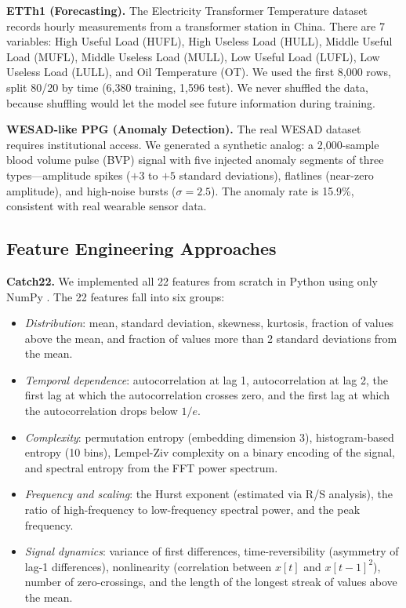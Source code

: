 \documentclass[10pt,conference]{IEEEtran}
\begin{document}
\textbf{ETTh1 (Forecasting).} The Electricity Transformer Temperature dataset \cite{ett} records hourly measurements from a transformer station in China. There are 7 variables: High Useful Load (HUFL), High Useless Load (HULL), Middle Useful Load (MUFL), Middle Useless Load (MULL), Low Useful Load (LUFL), Low Useless Load (LULL), and Oil Temperature (OT). We used the first 8,000 rows, split 80/20 by time (6,380 training, 1,596 test). We never shuffled the data, because shuffling would let the model see future information during training.

\textbf{WESAD-like PPG (Anomaly Detection).} The real WESAD dataset \cite{wesad} requires institutional access. We generated a synthetic analog: a 2,000-sample blood volume pulse (BVP) signal with five injected anomaly segments of three types---amplitude spikes ($+3$ to $+5$ standard deviations), flatlines (near-zero amplitude), and high-noise bursts ($\sigma = 2.5$). The anomaly rate is 15.9\%, consistent with real wearable sensor data.

\subsection{Feature Engineering Approaches}

\textbf{Catch22.} We implemented all 22 features from scratch in Python using only NumPy \cite{catch22}. The 22 features fall into six groups:
\begin{itemize}
  \item \textit{Distribution}: mean, standard deviation, skewness, kurtosis, fraction of values above the mean, and fraction of values more than 2 standard deviations from the mean.
  \item \textit{Temporal dependence}: autocorrelation at lag 1, autocorrelation at lag 2, the first lag at which the autocorrelation crosses zero, and the first lag at which the autocorrelation drops below $1/e$.
  \item \textit{Complexity}: permutation entropy (embedding dimension 3), histogram-based entropy (10 bins), Lempel-Ziv complexity on a binary encoding of the signal, and spectral entropy from the FFT power spectrum.
  \item \textit{Frequency and scaling}: the Hurst exponent (estimated via R/S analysis), the ratio of high-frequency to low-frequency spectral power, and the peak frequency.
  \item \textit{Signal dynamics}: variance of first differences, time-reversibility (asymmetry of lag-1 differences), nonlinearity (correlation between $x[t]$ and $x[t-1]^2$), number of zero-crossings, and the length of the longest streak of values above the mean.
\end{itemize}
\end{document}
